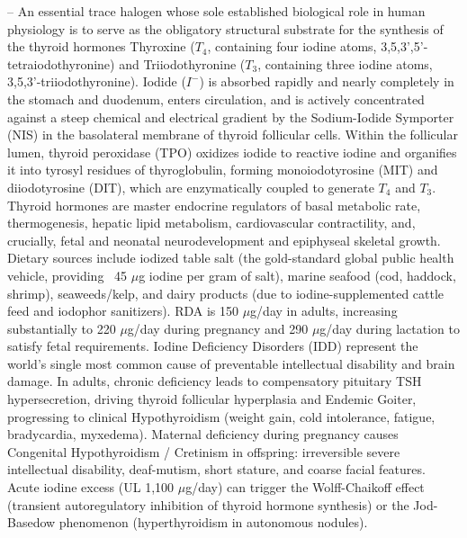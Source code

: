 -- An essential trace halogen whose sole established biological role in human physiology is to serve as the obligatory structural substrate for the synthesis of the thyroid hormones Thyroxine ($T_4$, containing four iodine atoms, 3,5,3',5'-tetraiodothyronine) and Triiodothyronine ($T_3$, containing three iodine atoms, 3,5,3'-triiodothyronine). Iodide ($I^-$) is absorbed rapidly and nearly completely in the stomach and duodenum, enters circulation, and is actively concentrated against a steep chemical and electrical gradient by the Sodium-Iodide Symporter (NIS) in the basolateral membrane of thyroid follicular cells. Within the follicular lumen, thyroid peroxidase (TPO) oxidizes iodide to reactive iodine and organifies it into tyrosyl residues of thyroglobulin, forming monoiodotyrosine (MIT) and diiodotyrosine (DIT), which are enzymatically coupled to generate $T_4$ and $T_3$. Thyroid hormones are master endocrine regulators of basal metabolic rate, thermogenesis, hepatic lipid metabolism, cardiovascular contractility, and, crucially, fetal and neonatal neurodevelopment and epiphyseal skeletal growth. Dietary sources include iodized table salt (the gold-standard global public health vehicle, providing ~45 $\mu$g iodine per gram of salt), marine seafood (cod, haddock, shrimp), seaweeds/kelp, and dairy products (due to iodine-supplemented cattle feed and iodophor sanitizers). RDA is 150 $\mu$g/day in adults, increasing substantially to 220 $\mu$g/day during pregnancy and 290 $\mu$g/day during lactation to satisfy fetal requirements. Iodine Deficiency Disorders (IDD) represent the world's single most common cause of preventable intellectual disability and brain damage. In adults, chronic deficiency leads to compensatory pituitary TSH hypersecretion, driving thyroid follicular hyperplasia and Endemic Goiter, progressing to clinical Hypothyroidism (weight gain, cold intolerance, fatigue, bradycardia, myxedema). Maternal deficiency during pregnancy causes Congenital Hypothyroidism / Cretinism in offspring: irreversible severe intellectual disability, deaf-mutism, short stature, and coarse facial features. Acute iodine excess (UL 1,100 $\mu$g/day) can trigger the Wolff-Chaikoff effect (transient autoregulatory inhibition of thyroid hormone synthesis) or the Jod-Basedow phenomenon (hyperthyroidism in autonomous nodules).


